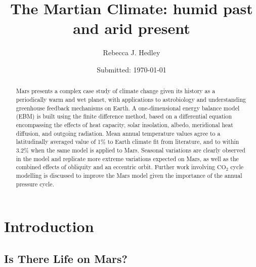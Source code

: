 \documentclass[12pt,onecolumn]{revtex4-2}    %
\begin{document}
\title{The Martian Climate: humid past and arid present} 
\date{Submitted: \today{}}
\author{Rebecca J. Hedley}


\begin{abstract}              

Mars presents a complex case study of climate change given its history as a periodically warm and wet planet, with applications to astrobiology and understanding greenhouse feedback mechanisms on Earth. A one-dimensional energy balance model (EBM) is built using the finite difference method, based on a differential equation encompassing the effects of heat capacity, solar insolation, albedo, meridional heat diffusion, and outgoing radiation. Mean annual temperature values agree to a latitudinally averaged value of 1\% to Earth climate fit from literature, and to within 3.2\% when the same model is applied to Mars. Seasonal variations are clearly observed in the model and replicate more extreme variations expected on Mars, as well as the combined effects of obliquity and an eccentric orbit. Further work involving $\mathrm{CO_2}$ cycle modelling is discussed to improve the Mars model given the importance of the annual pressure cycle.

\end{abstract}

\maketitle

\thispagestyle{plain} %

\newpage

\tableofcontents

\newpage

\section{Introduction} 

\subsection{Is There Life on Mars?}
\end{document}
